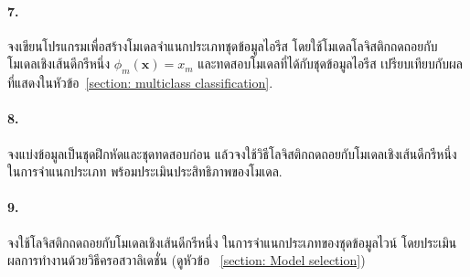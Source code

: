 \paragraph{7.} จงเขียนโปรแกรมเพื่อสร้างโมเดลจำแนกประเภทชุดข้อมูลไอรีส โดยใช้โมเดลโลจิสติกถดถอยกับ โมเดลเชิงเส้นดีกรีหนึ่ง $\phi_m(\mathbf{x}) = x_m$
และทดสอบโมเดลที่ได้กับชุดข้อมูลไอรีส เปรียบเทียบกับผลที่แสดงในหัวข้อ~\ref{section: multiclass classification}.

\paragraph{8.} จงแบ่งข้อมูลเป็นชุดฝึกหัดและชุดทดสอบก่อน แล้วจงใช้วิธีโลจิสติกถดถอยกับโมเดลเชิงเส้นดีกรีหนึ่ง ในการจำแนกประเภท พร้อมประเมินประสิทธิภาพของโมเดล.

\paragraph{9.} จงใช้โลจิสติกถดถอยกับโมเดลเชิงเส้นดีกรีหนึ่ง ในการจำแนกประเภทของชุดข้อมูลไวน์ โดยประเมินผลการทำงานด้วยวิธีครอสวาลิเดชั่น (ดูหัวข้อ~ \ref{section: Model selection})